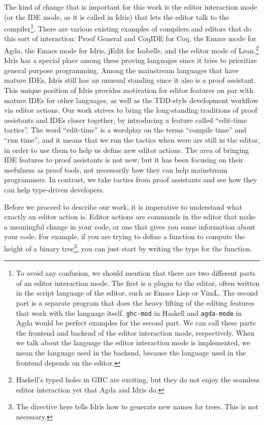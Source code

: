 The kind of change that is important for this work is the editor
interaction mode (or the IDE mode, as it is called in Idris\cite{idris}) that
lets the editor talk to the compiler\footnote{To avoid any confusion,
we should mention that there are two different parts of an editor interaction
mode. The first is a plugin to the editor, often written in the script language
of the editor, such as Emacs Lisp or VimL. The second part is a separate
program that does the heavy lifting of the editing features that work with the
language itself.  \texttt{ghc-mod} in Haskell and \texttt{agda-mode} in Agda would
be perfect examples for the second part. We can call these parts the frontend
and backend of the editor interaction mode, respectively.  When we talk about
the language the editor interaction mode is implemented, we mean the language
used in the backend, because the language used in the frontend depends on the
editor.}.
There are various existing examples of compilers and editors that do this sort
of interaction:
Proof General\cite{pg} and CoqIDE for Coq\cite{coq},
the Emacs mode\cite{agdamode} for Agda,
the Emacs mode\cite{idrismode} for Idris,
jEdit\cite{isabellejedit} for Isabelle,
and the editor mode of Lean\cite{lean}.\footnote{Haskell's typed holes in GHC
are exciting, but they do not enjoy the seamless editor interaction yet that
Agda and Idris do.}
Idris has a special place among these proving languages since it tries to
prioritize general purpose programming. Among the mainstream languages
that have mature IDEs, Idris still has an unusual standing since it also is a
proof assistant.\cite{idrisfaq}
This unique position of Idris provides motivation for editor features on par
with mature IDEs for other languages, as well as the TDD-style development
workflow via editor actions.
Our work strives to bring the long-standing traditions of proof assistants and
IDEs closer together, by introducing a feature called ``edit-time tactics''.
The word ``edit-time'' is a wordplay on the terms ``compile time'' and ``run
time'', and it means that we run the tactics when were are still in the editor,
in order to use them to help us define new editor actions.
The area of bringing IDE features to proof assistants is not new\cite{ctcoq,
developingReuse, realTheoremProvers, toolSupport}, but it has been focusing
on their usefulness as proof tools, not necessarily how they can help
mainstream programmers. In contrast, we take tactics from proof assistants
and see how they can help type-driven developers.

Before we proceed to describe our work,
it is imperative to understand what exactly an editor action is.
Editor actions are commands in the editor that make a meaningful
change in your code, or one that gives you some information about your
code. For example, if you are trying to define a function to compute the height
of a binary tree\footnote{The \texttt{} directive here tells
Idris how to generate new names for trees. This is not necessary.}, you can
just start by writing the type for the function.

